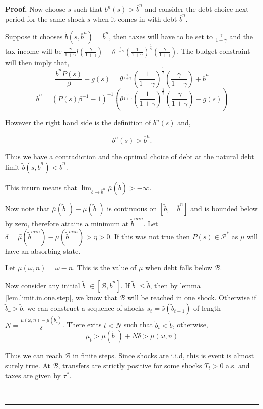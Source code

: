 \documentclass[thmsb,11pt]{article}
\newenvironment{proof}[1][Proof]{\noindent \textbf{#1.} }{\  \rule{0.5em}{0.5em}}
\begin{document}
\begin{proof}
Now choose $s$ such that $b^{n}(s)>\overline b^{n}$ and consider the debt choice next period for the same shock $s$ when it comes in with debt $\overline b^{n}$.


Suppose it chooses $\tilde{b}(s,\overline {b}^{n})=\overline b^{n}$, then taxes will have to be set to $\frac{\gamma}{1+\gamma}$ and the tax income will be $\frac{\gamma}{1+\gamma}l(\frac{\gamma}{1+\gamma})=\theta^{\frac{\gamma}{1+\gamma}}\left(\frac{1}{1+\gamma}\right)^{\frac{1}{\gamma}}\left(\frac{\gamma}{1+\gamma} \right)$. The budget constraint will then imply that,
\[\frac{\overline  b^{n} P(s)}{\beta}+g(s)=\theta^{\frac{\gamma}{1+\gamma}}\left(\frac{1}{1+\gamma}\right)^{\frac{1}{\gamma}}\left(\frac{\gamma}{1+\gamma} \right)+\overline b^{n}\]
\[\overline b^{n}=(P(s)\beta^{-1}-1)^{-1}\left(\theta^{\frac{\gamma}{1+\gamma}}\left(\frac{1}{1+\gamma}\right)^{\frac{1}{\gamma}}\left(\frac{\gamma}{1+\gamma}\right) -g(s)\right) \]

However the  right hand side is the definition of $b^{n}(s)$ and,

\[b^{n}(s)>\overline b^{n}.\]

Thus we have a contradiction and the optimal choice of debt at the natural debt limit $\tilde{b}(s,\overline {b}^{n})<\overline b^{n}$.

This inturn means that $\lim_{\tilde b\to \overline b^{n}}\overline \mu (\tilde b) >-\infty$.


Now note that $\overline \mu(\tilde b\_)-\mu(\tilde b\_)$ is continuous on $[\check b, \quad \overline b^{n}]$ and is bounded below by zero, therefore attains a minimum at $\tilde b^{min}$. Let $\delta=\hat \mu(\tilde b^{min})-\mu(\tilde b^{min})>\eta>0$. If this was not true then $P(s)\in \mathcal {P}^*$ as $\mu$ will have an absorbing state.


Let $\mu(\omega,n)=\omega-n$. This is the value of $\mu$ when debt falls below $\mathcal{B}$.

Now consider any initial $\tilde b\_ \in [\mathcal{B},\overline b^{n}]$. If $\tilde{b}\_\leq \check b$, then by lemma \ref{lem.limit.in.one.step}, we know that $\mathcal{B}$ will be reached in one shock. Otherwise if $\tilde b\_>\check b$, we can construct a sequence of shocks $s_t=\hat s (\tilde b_{t-1})$ of length $N=\frac{\mu(\omega,n)-\mu(\tilde b\_)}{\delta}$. There exits $t<N$ such that $\tilde b_t<\check b$, otherwise,
\[\mu_t>\mu(\tilde b\_)+N\delta>\mu(\omega,n)\]

Thus we can reach $\mathcal{B}$ in finite steps. Since shocks are i.i.d, this is event is almost surely true. At $\mathcal{B}$, transfers are strictly positive for some shocks $T_t>0$ a.s. and taxes are given by $\tau^*$.





\end{proof}
\end{document}

